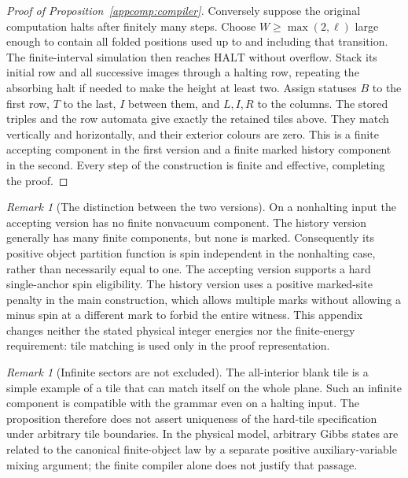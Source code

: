 \documentclass[11pt,reqno]{amsart}
\numberwithin{equation}{section}
\theoremstyle{definition}
\theoremstyle{remark}
\newtheorem{remark}[theorem]{Remark}
\begin{document}
\begin{proof}[Proof of Proposition~\ref{appcomp:compiler}]
Conversely suppose the original computation halts after finitely many
steps.  Choose $W\geq\max(2,\ell)$ large enough to contain all folded
positions used up to and including that transition.  The finite-interval
simulation then reaches $\mathrm{HALT}$ without overflow.  Stack its
initial row and all successive images through a halting row, repeating
the absorbing halt if needed to make the height at least two.  Assign
statuses $B$ to the first row, $T$ to the last, $I$ between them, and
$L,I,R$ to the columns.  The stored triples and the row automata give
exactly the retained tiles above.  They match vertically and
horizontally, and their exterior colours are zero.  This is a finite
accepting component in the first version and a finite marked history
component in the second.  Every step of the construction is finite
and effective, completing the proof.
\end{proof}

\begin{remark}[The distinction between the two versions]
\label{appcomp:distinction}
On a nonhalting input the accepting version has no finite nonvacuum
component.  The history version generally has many finite components,
but none is marked.  Consequently its positive object partition
function is spin independent in the nonhalting case, rather than
necessarily equal to one.  The accepting version supports a hard
single-anchor spin eligibility.  The history version uses a positive
marked-site penalty in the main construction, which allows multiple
marks without allowing a minus spin at a different mark to forbid the
entire witness.  This appendix changes neither the stated physical
integer energies nor the finite-energy requirement: tile matching is
used only in the proof representation.
\end{remark}

\begin{remark}[Infinite sectors are not excluded]
\label{appcomp:infinite}
The all-interior blank tile is a simple example of a tile that can
match itself on the whole plane.  Such an infinite component is
compatible with the grammar even on a halting input.  The proposition
therefore does not assert uniqueness of the hard-tile specification
under arbitrary tile boundaries.  In the physical model, arbitrary
Gibbs states are related to the canonical finite-object law by a
separate positive auxiliary-variable mixing argument; the finite
compiler alone does not justify that passage.
\end{remark}
\end{document}
